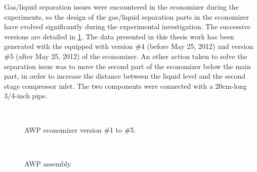 Gas/liquid separation issues were encountered in the economizer during
the experiments, so the design of the gas/liquid separation parts in
the economizer have evolved significantly during the experimental
investigation. The successive versions are detailed in
\cref{fig:awp-eco-gas-liq-sep-1-to-5}. The data presented in this
thesis work has been generated with the \AWP{} equipped with version
\#4 (before May 25\th{}, 2012) and version \#5 (after May 25\th{},
2012) of the economizer. An other action taken to solve the separation
issue was to move the second part of the economizer below the main
part, in order to increase the distance between the liquid level and
the second stage compressor inlet. The two components were connected
with a 20cm-long 3/4-inch pipe.

\begin{figure}[htbp]
  \centering {}
  \\\vspace{4em}
  \caption{AWP economizer version \#1 to \#5.}
  \label{fig:awp-eco-gas-liq-sep-1-to-5}
\end{figure}

\begin{figure}[htbp]
  \centering
  \begin{minipage}[r]{.49\linewidth}
    \begin{flushright}
    \end{flushright}
  \end{minipage} \hfill
  \begin{minipage}[l]{.49\linewidth}
    \begin{flushleft}
       \\
    \end{flushleft}
  \end{minipage}
  \caption{AWP assembly}
  \label{fig:awp_assembly}
\end{figure}

